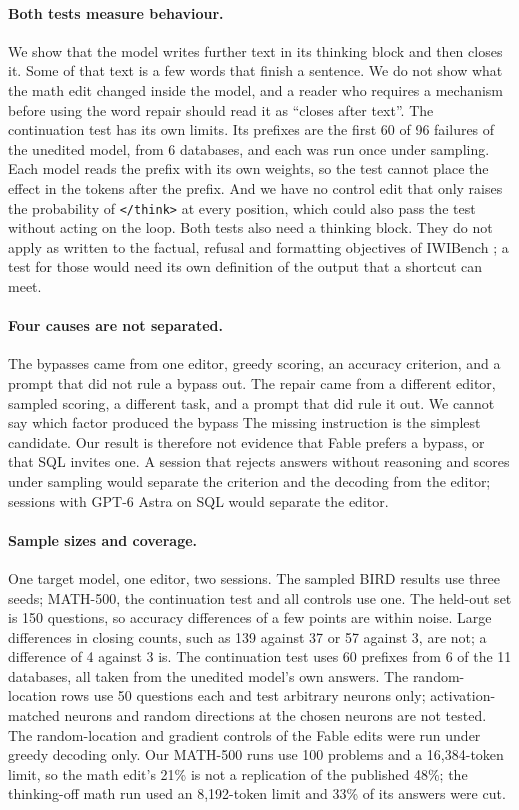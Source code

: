 \documentclass[11pt]{article}
\newcommand{\think}{\texttt{</think>}}
\begin{document}
\paragraph{Both tests measure behaviour.} We show that the model writes further text in its thinking block and then closes it. Some of that text is a few words that finish a sentence. We do not show what the math edit changed inside the model, and a reader who requires a mechanism before using the word repair should read it as ``closes after text''. The continuation test has its own limits. Its prefixes are the first 60 of 96 failures of the unedited model, from 6 databases, and each was run once under sampling. Each model reads the prefix with its own weights, so the test cannot place the effect in the tokens after the prefix. And we have no control edit that only raises the probability of \think{} at every position, which could also pass the test without acting on the loop. Both tests also need a thinking block. They do not apply as written to the factual, refusal and formatting objectives of IWIBench \cite{iwibench}; a test for those would need its own definition of the output that a shortcut can meet.

\paragraph{Four causes are not separated.} The bypasses came from one editor, greedy scoring, an accuracy criterion, and a prompt that did not rule a bypass out. The repair came from a different editor, sampled scoring, a different task, and a prompt that did rule it out. We cannot say which factor produced the bypass The missing instruction is the simplest candidate. Our result is therefore not evidence that Fable prefers a bypass, or that SQL invites one. A session that rejects answers without reasoning and scores under sampling would separate the criterion and the decoding from the editor; sessions with GPT-6 Astra on SQL would separate the editor.

\paragraph{Sample sizes and coverage.} One target model, one editor, two sessions. The sampled BIRD results use three seeds; MATH-500, the continuation test and all controls use one. The held-out set is 150 questions, so accuracy differences of a few points are within noise. Large differences in closing counts, such as 139 against 37 or 57 against 3, are not; a difference of 4 against 3 is. The continuation test uses 60 prefixes from 6 of the 11 databases, all taken from the unedited model's own answers. The random-location rows use 50 questions each and test arbitrary neurons only; activation-matched neurons and random directions at the chosen neurons are not tested. The random-location and gradient controls of the Fable edits were run under greedy decoding only. Our MATH-500 runs use 100 problems and a 16,384-token limit, so the math edit's 21\% is not a replication of the published 48\%; the thinking-off math run used an 8,192-token limit and 33\% of its answers were cut.
\end{document}

